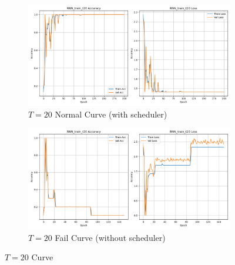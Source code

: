 \documentclass{article}
\begin{document}
\begin{appendix}
\begin{figure}[!htbp]
  \centering
  \begin{subfigure}[b]{1\textwidth}
    \includegraphics[width=\textwidth]{img/Part3/RNN_train_t20.png}
    \caption{$T=20$ Normal Curve (with scheduler)}
  \end{subfigure}
  \begin{subfigure}[b]{1\textwidth}
    \includegraphics[width=\textwidth]{img/Part3/RNN_train_t20_fail.png}
    \caption{$T=20$ Fail Curve (without scheduler)}
  \end{subfigure}
  \caption{$T=20$ Curve}
  \label{fig:p3_t=20}
\end{figure}

\end{appendix}
\end{document}
